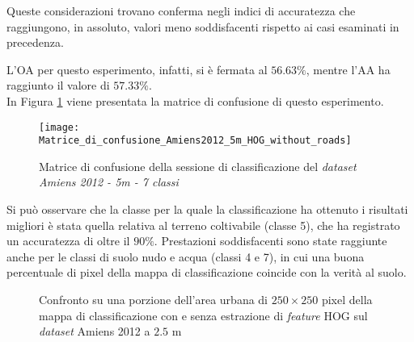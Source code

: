 Queste considerazioni trovano conferma negli indici di accuratezza che
raggiungono, in assoluto, valori meno soddisfacenti rispetto ai casi
esaminati in precedenza.

L'OA per questo esperimento, infatti, si è fermata al $56.63\%$,
mentre l'AA ha raggiunto il valore di $57.33\%$.\\

In Figura \ref{fig:Matrice_di_confusione_Amiens2012_5m_HOG_without_roads}
viene presentata la matrice di confusione di questo esperimento. \\

\begin{figure}[!ht]

\texttt{[image: Matrice\_di\_confusione\_Amiens2012\_5m\_HOG\_without\_roads]}

\caption{Matrice di confusione della sessione di classificazione del
\emph{dataset} \emph{Amiens 2012 - 5m - 7 classi}}

\label{fig:Matrice_di_confusione_Amiens2012_5m_HOG_without_roads}
\end{figure}

Si può osservare che la classe per la quale la classificazione ha
ottenuto i risultati migliori è stata quella relativa al terreno
coltivabile (classe 5), che ha registrato un accuratezza di oltre il $90\%$.
Prestazioni soddisfacenti sono state raggiunte anche per le classi di
suolo nudo e acqua (classi 4 e 7), in cui una buona percentuale di
pixel della mappa di classificazione coincide con la verità al
suolo.\\

 \begin{figure}[!ht]

\center


 \hspace{3mm}

  \caption{Confronto su una porzione dell'area urbana di
$250\times250$ pixel della mappa di classificazione con e senza
estrazione di \emph{feature} HOG sul \emph{dataset} Amiens 2012 a
$2.5$ m }
 \label{fig:confrontoAmiens2012_2_5m}
\end{figure}

